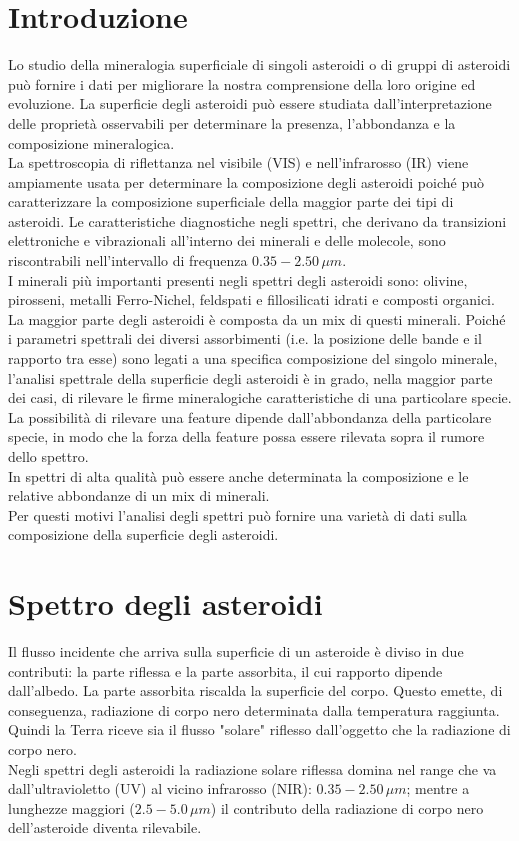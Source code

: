 \documentclass[a4paper,11pt,openright]{book}
\begin{document}
\section{Introduzione}
Lo studio della mineralogia superficiale di singoli asteroidi o di gruppi di asteroidi può fornire i dati per migliorare la nostra comprensione della loro origine ed evoluzione. La superficie degli asteroidi può essere studiata dall'interpretazione delle proprietà osservabili per determinare la presenza, l'abbondanza e la composizione mineralogica.\\
La spettroscopia di riflettanza nel visibile (VIS) e nell'infrarosso (IR) viene ampiamente usata per determinare la composizione degli asteroidi poiché può caratterizzare la composizione superficiale della maggior parte dei tipi di asteroidi. Le caratteristiche diagnostiche negli spettri, che derivano da transizioni elettroniche e vibrazionali all'interno dei minerali e delle molecole, sono riscontrabili nell'intervallo di frequenza $0.35-2.50\,\mu m$.\\
I minerali più importanti presenti negli spettri degli asteroidi sono: olivine, pirosseni, metalli Ferro-Nichel, feldspati e fillosilicati idrati e composti organici.\\
La maggior parte degli asteroidi è composta da un mix di questi minerali. Poiché i parametri spettrali dei diversi assorbimenti (i.e. la posizione delle bande e il rapporto tra esse) sono legati a una specifica composizione del singolo minerale, l'analisi spettrale della superficie degli asteroidi è in grado, nella maggior parte dei casi, di rilevare le firme mineralogiche caratteristiche di una particolare specie.\\
La possibilità di rilevare una feature dipende dall'abbondanza della particolare specie, in modo che la forza della feature possa essere rilevata sopra il rumore dello spettro.\\
In spettri di alta qualità può essere anche determinata la composizione e le relative abbondanze di un mix di minerali.\\
Per questi motivi l'analisi degli spettri può fornire una varietà di dati sulla composizione della superficie degli asteroidi.

\section{Spettro degli asteroidi}
Il flusso incidente che arriva sulla superficie di un asteroide è diviso in due contributi: la parte riflessa e la parte assorbita, il cui rapporto dipende dall'albedo. La parte assorbita riscalda la superficie del corpo. Questo emette, di conseguenza, radiazione di corpo nero determinata dalla temperatura raggiunta. Quindi la Terra riceve sia il flusso "solare" riflesso dall'oggetto che la radiazione di corpo nero.\\
Negli spettri degli asteroidi la radiazione solare riflessa domina nel range che va dall'ultravioletto (UV) al vicino infrarosso (NIR): $0.35-2.50\,\mu m$; mentre a lunghezze maggiori ($2.5-5.0\,\mu m$) il contributo della radiazione di corpo nero dell'asteroide diventa rilevabile.
\end{document}
